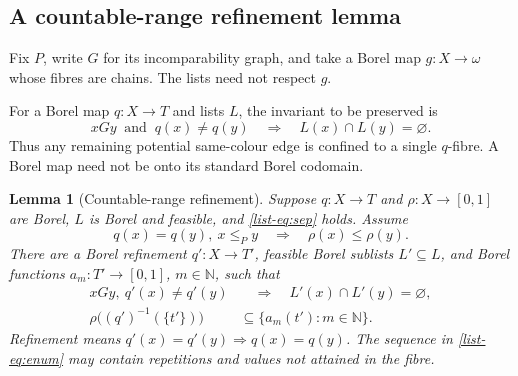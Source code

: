 \documentclass[11pt,reqno]{amsart}
\theoremstyle{plain}
\newtheorem{lemma}[theorem]{Lemma}
\theoremstyle{definition}
\theoremstyle{remark}
\newcommand{\N}{\mathbb N}
\begin{document}
\subsection{A countable-range refinement lemma}

Fix $P$, write $G$ for its incomparability graph, and take a Borel map
$g:X\to\omega$ whose fibres are chains. The lists need not respect $g$.

For a Borel map $q:X\to T$ and lists $L$, the invariant to be preserved is
\begin{equation*}\label{list-eq:sep}
xGy\ \text{ and }\ q(x)\ne q(y)
\quad\Longrightarrow\quad L(x)\cap L(y)=\varnothing.
\tag{S}
\end{equation*}
Thus any remaining potential same-colour edge is confined to a single
$q$-fibre. A Borel map need not be onto its standard Borel codomain.

\begin{lemma}[Countable-range refinement]\label{list-lem:refine}
Suppose $q:X\to T$ and $\rho:X\to[0,1]$ are Borel, $L$ is Borel and
feasible, and \eqref{list-eq:sep} holds. Assume
\begin{equation*}
q(x)=q(y),\ x\le_P y\quad\Longrightarrow\quad\rho(x)\le\rho(y).
\end{equation*}
There are a Borel refinement $q':X\to T'$, feasible Borel sublists
$L'\subseteq L$, and Borel functions $a_m:T'\to[0,1]$, $m\in\N$, such that
\begin{align}
xGy,\ q'(x)\ne q'(y)&\quad\Longrightarrow\quad L'(x)\cap L'(y)=\varnothing,
\label{list-eq:new-sep}\\
\rho\bigl((q')^{-1}(\{t'\})\bigr)&\subseteq\{a_m(t'):m\in\N\}.
\label{list-eq:enum}
\end{align}
Refinement means $q'(x)=q'(y)\Rightarrow q(x)=q(y)$. The sequence in
\eqref{list-eq:enum} may contain repetitions and values not attained in the
fibre.
\end{lemma}
\end{document}
